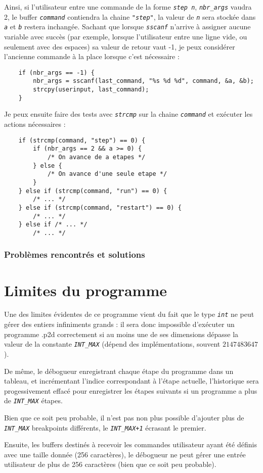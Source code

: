 \documentclass[a4paper,11pt]{article}
\newcommand{\code}[1]{{\itshape\lstinline{#1}}}
\begin{document}
Ainsi, si l'utilisateur entre une commande de la forme \code{step n}, \code{nbr_args} vaudra 2, le buffer \code{command} contiendra la chaine \code{"step"}, la valeur de \code{n} sera stockée dans \code{a} et \code{b} restera inchangée.
Sachant que lorsque \code{sscanf} n'arrive à assigner aucune variable avec succès (par exemple, lorsque l'utilisateur entre une ligne vide, ou seulement avec des espaces) sa valeur de retour vaut -1, je peux considérer l'ancienne commande à la place lorsque c'est nécessaire :
{\small\begin{lstlisting}
    if (nbr_args == -1) {
        nbr_args = sscanf(last_command, "%s %d %d", command, &a, &b);
        strcpy(userinput, last_command);
    }
\end{lstlisting}}

Je peux ensuite faire des tests avec \code{strcmp} sur la chaine \code{command} et exécuter les actions nécessaires :
{\small\begin{lstlisting}
    if (strcmp(command, "step") == 0) {
        if (nbr_args == 2 && a >= 0) {
            /* On avance de a etapes */
        } else {
            /* On avance d'une seule etape */
        }
    } else if (strcmp(command, "run") == 0) {
        /* ... */
    } else if (strcmp(command, "restart") == 0) {
        /* ... */
    } else if /* ... */
        /* ... */
\end{lstlisting}}


\subsubsection*{Problèmes rencontrés et solutions}


\section*{Limites du programme}

Une des limites évidentes de ce programme vient du fait que le type \code{int} ne peut gérer des entiers infiniments grands : il sera donc impossible d'exécuter un programme .p2d correctement si au moins une de ses dimensions dépasse la valeur de la constante \code{INT_MAX} (dépend des implémentations, souvent $2 147 483 647$).

De même, le débogueur enregistrant chaque étape du programme dans un tableau, et incrémentant l'indice correspondant à l'étape actuelle, l'historique sera progessivement effacé pour enregistrer les étapes suivants si un programme a plus de \code{INT_MAX} étapes.

Bien que ce soit peu probable, il n'est pas non plus possible d'ajouter plus de \code{INT_MAX} breakpoints différents, le \code{INT_MAX+1} écrasant le premier.

Ensuite, les buffers destinés à recevoir les commandes utilisateur ayant été définis avec une taille donnée (256 caractères), le débogueur ne peut gérer une entrée utilisateur de plus de 256 caractères (bien que ce soit peu probable).
\end{document}
